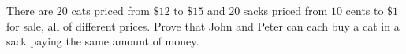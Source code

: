 There are $20$ cats priced from $\$12$ to $\$15$ and $20$ sacks priced from $10$ cents to $\$1$ for sale, all of different prices. Prove that John and Peter can each buy a cat in a sack paying the same amount of money.